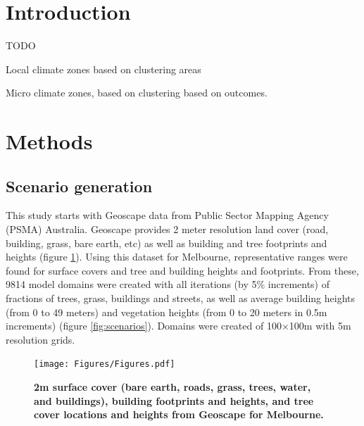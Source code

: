 \documentclass[final,3p,times,authoryear]{elsarticle}
\begin{document}
\maketitle





\section{Introduction}
TODO
   

Local climate zones based on clustering areas

Micro climate zones, based on clustering based on outcomes.

\section{Methods}\label{sec:methods}

\subsection{Scenario generation}\label{sec:methodsgen}
This study starts with Geoscape \citep{Geoscape2020} data from Public Sector Mapping Agency (PSMA) Australia. Geoscape provides 2 meter resolution land cover (road, building, grass, bare earth, etc) as well as building and tree footprints and heights (figure \ref{fig:geoscape}). Using this dataset for Melbourne, representative ranges were found for surface covers and tree and building heights and footprints. From these, 9814 model domains were created with all iterations (by 5\% increments) of fractions of trees, grass, buildings and streets, as well as average building heights (from 0 to 49 meters) and vegetation heights (from 0 to 20 meters in 0.5m increments) (figure \ref{fig:scenarios}). Domains were created of 100$\times$100m with 5m resolution grids.



\begin{figure}
\centering
\texttt{[image: Figures/Figures.pdf]}
\caption{\bf 2m surface cover (bare earth, roads, grass, trees, water, and buildings), building footprints and heights, and tree cover locations and heights from Geoscape for Melbourne.}
 \label{fig:geoscape}
\end{figure} 
\end{document}
